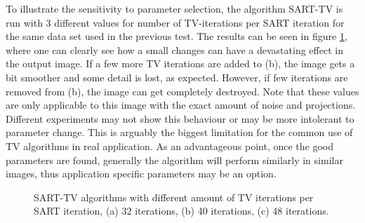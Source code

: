 \begin{table}
\begin{center}
\caption{NRMSE for the reconstructed images in figure \ref{fig:TVXCAT}}
\label{tab:NRMSE TVs}
\end{center}
\end{table}






To illustrate the sensitivity to parameter selection, the algorithm SART-TV is run with 3 different values for number of TV-iterations per SART iteration for the same data set used in the previous test. The results can be seen in figure \ref{fig:SARTTVparams}, where one can clearly see how a small changes can have a devastating effect in the output image.   If a few more TV iterations are added to (b), the image gets a bit smoother and some detail is lost, as expected. However, if few iterations are removed from (b), the image can get completely destroyed. Note that these values are only applicable to this image with the exact amount of noise and projections. Different experiments may not show this behaviour or may be more intolerant to parameter change. This is arguably the biggest limitation for the common use of TV algorithms in real application. As an advantageous point, once the good parameters are found, generally the algorithm will perform similarly in similar images, thus application specific parameters may be an option.






\begin{figure}
\centering
{}
\caption[SART-TV algorithms with different parameters]{\label{fig:SARTTVparams}SART-TV algorithms with different amount of TV iterations per SART iteration, (a) 32 iterations, (b) 40 iterations, (c) 48 iterations.}
\end{figure}



